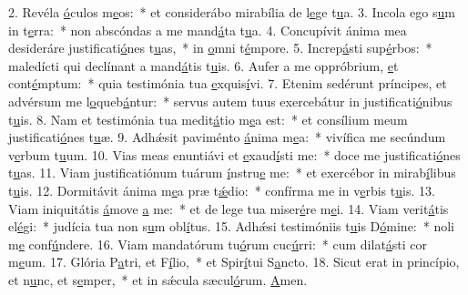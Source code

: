 2. Revéla \uline{ó}culos m\uline{e}os:~* et considerábo mirabília de l\uline{e}ge t\uline{u}a.
3. Incola ego s\uline{u}m in t\uline{e}rra:~* non abscóndas a me mand\uline{á}ta t\uline{u}a.
4. Concupívit ánima mea desideráre justificati\uline{ó}nes t\uline{u}as,~* in \uline{o}mni t\uline{é}mpore.
5. Increp\uline{á}sti sup\uline{é}rbos:~* maledícti qui declínant a mand\uline{á}tis t\uline{u}is.
6. Aufer a me oppróbrium, \uline{e}t cont\uline{é}mptum:~* quia testimónia tua \uline{e}xquis\uline{í}vi.
7. Etenim sedérunt príncipes, et advérsum me l\uline{o}queb\uline{á}ntur:~* servus autem tuus exercebátur in justificati\uline{ó}nibus t\uline{u}is.
8. Nam et testimónia tua medit\uline{á}tio m\uline{e}a est:~* et consílium meum justificati\uline{ó}nes t\uline{u}æ.
9. Adhǽsit paviménto \uline{á}nima m\uline{e}a:~* vivífica me secúndum v\uline{e}rbum t\uline{u}um.
10. Vias meas enuntiávi et \uline{e}xaud\uline{í}sti me:~* doce me justificati\uline{ó}nes t\uline{u}as.
11. Viam justificatiónum tuárum \uline{í}nstru\uline{e} me:~* et exercébor in mirab\uline{í}libus t\uline{u}is.
12. Dormitávit ánima m\uline{e}a præ t\uline{ǽ}dio:~* confírma me in v\uline{e}rbis t\uline{u}is.
13. Viam iniquitátis \uline{á}move \uline{a} me:~* et de lege tua miser\uline{é}re m\uline{e}i.
14. Viam verit\uline{á}tis el\uline{é}gi:~* judícia tua non s\uline{u}m obl\uline{í}tus.
15. Adhǽsi testimóniis t\uline{u}is D\uline{ó}mine:~* noli m\uline{e} conf\uline{ú}ndere.
16. Viam mandatórum tu\uline{ó}rum cuc\uline{ú}rri:~* cum dilat\uline{á}sti cor m\uline{e}um.
17. Glória P\uline{a}tri, et F\uline{í}lio,~* et Spir\uline{í}tui S\uline{a}ncto.
18. Sicut erat in princípio, et n\uline{u}nc, et s\uline{e}mper,~* et in sǽcula sæcul\uline{ó}rum. \uline{A}men.
